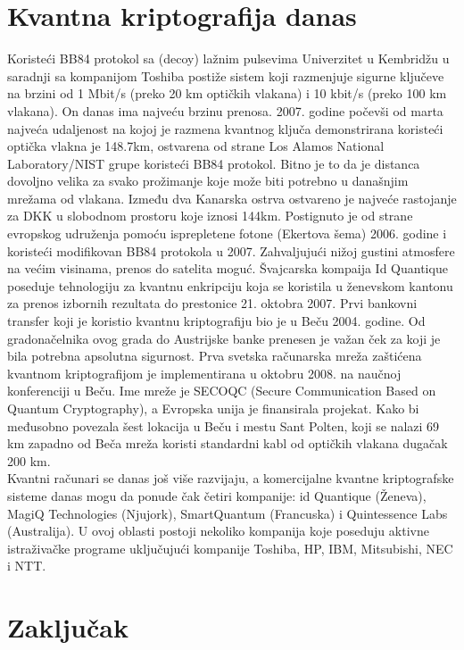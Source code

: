 \documentclass[a4paper]{article}
\begin{document}
{\section{Kvantna kriptografija danas}
Koristeći BB84 protokol sa (decoy) lažnim pulsevima Univerzitet u Kembridžu u saradnji sa kompanijom Toshiba postiže sistem koji razmenjuje sigurne ključeve na brzini od 1 Mbit/s (preko 20 km optičkih vlakana) i 10 kbit/s (preko 100 km vlakana). On danas ima najveću brzinu prenosa. 
2007. godine počevši od marta najveća udaljenost na kojoj je razmena kvantnog ključa demonstrirana koristeći optička vlakna je 148.7km, ostvarena od strane Los Alamos National Laboratory/NIST grupe koristeći BB84 protokol. Bitno je to da je distanca dovoljno velika za svako prožimanje koje može biti potrebno u današnjim mrežama od vlakana. Između dva Kanarska ostrva ostvareno je najveće rastojanje za DKK u slobodnom prostoru koje iznosi 144km. Postignuto je od strane evropskog udruženja pomoću isprepletene fotone (Ekertova šema) 2006. godine i koristeći modifikovan BB84 protokola u 2007. Zahvaljujući nižoj gustini atmosfere na većim visinama, prenos do satelita moguć.
 Švajcarska kompaija Id Quantique poseduje tehnologiju za kvantnu enkripciju koja se koristila u ženevskom kantonu za prenos izbornih rezultata do
prestonice 21. oktobra 2007.
Prvi bankovni transfer koji je koristio kvantnu kriptografiju bio je u Beču 2004. godine. Od gradonačelnika ovog grada do Austrijske banke prenesen je važan ček za koji je bila potrebna apsolutna sigurnost. Prva svetska
računarska mreža zaštićena kvantnom kriptografijom je implementirana u oktobru
2008. na naučnoj konferenciji u Beču. Ime mreže je SECOQC (Secure
Communication Based on Quantum Cryptography), a Evropska unija je finansirala
projekat. Kako bi međusobno povezala šest lokacija u Beču i mestu Sant Polten, koji se nalazi 69 km
zapadno od Beča mreža koristi standardni kabl od optičkih vlakana dugačak 200 km.\\
Kvantni računari se danas još više razvijaju, a komercijalne kvantne kriptografske sisteme danas mogu da ponude čak četiri kompanije: id Quantique (Ženeva), MagiQ Technologies (Njujork), SmartQuantum (Francuska) i Quintessence Labs (Australija). U ovoj oblasti postoji nekoliko kompanija koje poseduju aktivne istraživačke programe uključujući kompanije Toshiba, HP, IBM, Mitsubishi, NEC i NTT. 
\section{Zaključak}
\label{sec:zakljucak}

}
\end{document}
